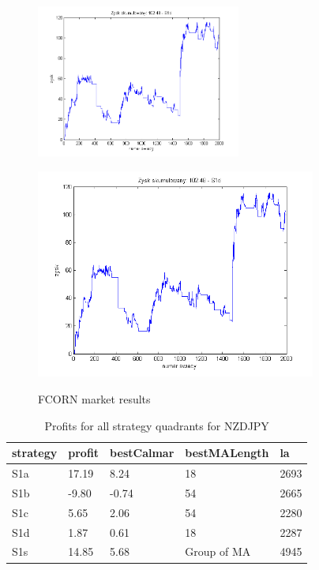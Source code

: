 \documentclass{tewiart}
\begin{document}
\begin{figure}[h]
\begin{minipage}{\linewidth}
\centering
\includegraphics[width=0.6\textwidth]{images/fcornS1d.png}
\label{mansard}
\end{minipage}
\begin{minipage}{.49\linewidth}
\centering
\includegraphics[width=0.82\textwidth]{images/fcornS1s.png}
\label{mansard}
\end{minipage}
\caption{FCORN market results}
\end{figure}
\newpage
\begin{table}[!t]
\caption{Profits for all strategy quadrants for NZDJPY}
 \begin{center}
 \begin{tabular}{|l|l|l|l|l|}
 \hline \textbf{strategy} & \textbf{profit} & \textbf{bestCalmar} & \textbf{bestMALength} & \textbf{la} \\ \hline
S1a & 17.19 & 8.24 & 18 & 2693\\ \hline
S1b & -9.80 & -0.74 & 54 & 2665\\ \hline
S1c & 5.65 & 2.06 & 54 & 2280\\ \hline
S1d & 1.87 & 0.61 & 18 & 2287\\ \hline
S1s & 14.85 & 5.68 & Group of MA & 4945\\
\hline \end{tabular}
 \end{center}
 \end{table}
\end{document}

